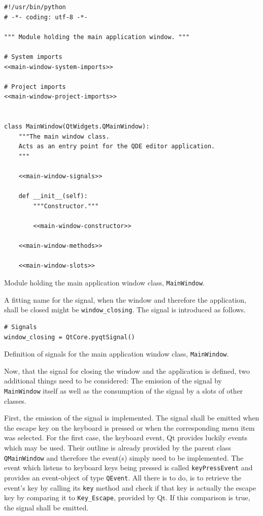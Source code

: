 \documentclass[10pt, openright, notitlepage]{scrreprt}
\begin{document}
\begin{listing}[H]
\begin{verbatim}
#!/usr/bin/python
# -*- coding: utf-8 -*-

""" Module holding the main application window. """

# System imports
<<main-window-system-imports>>

# Project imports
<<main-window-project-imports>>


class MainWindow(QtWidgets.QMainWindow):
    """The main window class.
    Acts as an entry point for the QDE editor application.
    """

    <<main-window-signals>>

    def __init__(self):
        """Constructor."""

        <<main-window-constructor>>

    <<main-window-methods>>

    <<main-window-slots>>
\end{verbatim}
\caption{Module holding the main application window class, \texttt{MainWindow}.}
\end{listing}

A fitting name for the signal, when the window and therefore the application,
shall be closed might be \texttt{window\_closing}. The signal is introduced as follows.

\begin{listing}[H]
\begin{verbatim}
# Signals
window_closing = QtCore.pyqtSignal()
\end{verbatim}
\caption{\label{main-window-signals}
Definition of signals for the main application window class, \texttt{MainWindow}.}
\end{listing}

Now, that the signal for closing the window and the application is defined, two
additional things need to be considered: The emission of the signal by
\texttt{MainWindow} itself as well as the consumption of the signal by a slots of other
classes.

First, the emission of the signal is implemented. The signal shall be emitted
when the escape key on the keyboard is pressed or when the corresponding menu
item was selected. For the first case, the keyboard event, Qt provides luckily
events which may be used. Their outline is already provided by the parent class
\texttt{QMainWindow} and therefore the event(s) simply need to be implemented. The
event which listens to keyboard keys being pressed is called \texttt{keyPressEvent} and
provides an event-object of type \texttt{QEvent}. All there is to do, is to retrieve
the event's key by calling its \texttt{key} method and check if that key is actually
the escape key by comparing it to \texttt{Key\_Escape}, provided by Qt. If this
comparison is true, the signal shall be emitted.
\end{document}
